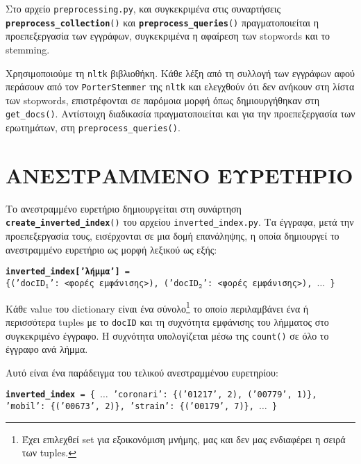 ﻿\documentclass[12pt]{report}
\begin{document}
    Στο αρχείο \texttt{preprocessing.py}, και συγκεκριμένα στις συναρτήσεις \texttt{\textbf{preprocess\_collection}()} και \texttt{\textbf{preprocess\_queries}()}
    πραγματοποιείται η προεπεξεργασία των εγγράφων, συγκεκριμένα η αφαίρεση των stopwords και το stemming.

    Χρησιμοποιούμε τη \texttt{nltk} βιβλιοθήκη. Κάθε λέξη από τη συλλογή των εγγράφων αφού περάσουν από τον \texttt{PorterStemmer} της \texttt{nltk}
    και ελεγχθούν ότι δεν ανήκουν στη λίστα των stopwords, επιστρέφονται σε παρόμοια μορφή όπως δημιουργήθηκαν στη \verb|get_docs()|.
    Αντίστοιχη διαδικασία πραγματοποιείται και για την προεπεξεργασία των ερωτημάτων, στη \verb|preprocess_queries()|.


    \section{ΑΝΕΣΤΡΑΜΜΕΝΟ ΕΥΡΕΤΗΡΙΟ}

    Το ανεστραμμένο ευρετήριο δημιουργείται στη συνάρτηση \texttt{\textbf{create\_inverted\_index}()} του αρχείου \verb|inverted_index.py|.
    Τα έγγραφα, μετά την προεπεξεργασία τους, εισέρχονται σε μια δομή επανάληψης, \linebreak η οποία δημιουργεί το ανεστραμμένο ευρετήριο ως μορφή λεξικού ως εξής:

    \begin{graycomment}
        \centering
        \texttt{\small \textbf{inverted\_index['λήμμα']} = \\ \{('docID\(_\texttt{1}\)': <φορές εμφάνισης>), ('docID\(_\texttt{2}\)': <φορές εμφάνισης>), \(\ldots\) \}}
    \end{graycomment}

    Κάθε value του dictionary είναι ένα σύνολο\footnote{Έχει επιλεχθεί set για εξοικονόμιση μνήμης, μας και δεν μας ενδιαφέρει η σειρά των tuples.} το οποίο περιλαμβάνει ένα ή περισσότερα tuples με το \texttt{docID}
    και τη συχνότητα εμφάνισης του λήμματος στο συγκεκριμένο έγγραφο. Η συχνότητα υπολογίζεται μέσω της \texttt{count()} σε όλο το έγγραφο ανά λήμμα.

    Αυτό είναι ένα παράδειγμα του τελικού ανεστραμμένου ευρετηρίου:

    \begin{graycomment}
        \centering
        \texttt{\small \textbf{inverted\_index} = \{ \(\ldots\) 'coronari': \{('01217', 2), ('00779', 1)\}, \\ 'mobil': \{('00673', 2)\}, 'strain': \{('00179', 7)\}, \(\ldots\) \}}
    \end{graycomment}
\end{document}
